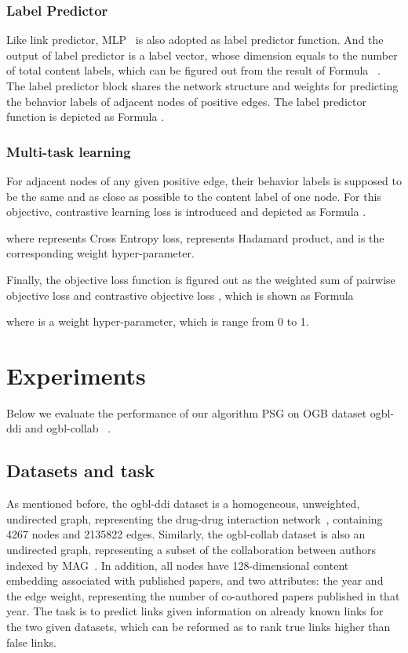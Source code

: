 \documentclass[sigconf]{acmart}
\begin{document}
\subsubsection{Label Predictor}
Like link predictor, MLP~\cite{murtagh1991multilayer} is also adopted as label predictor function. And the output of label predictor is a label vector, whose dimension equals to the number of total content labels, which can be figured out from the result of Formula ~. The label predictor block shares the network structure and weights for predicting the behavior labels of adjacent nodes of positive edges. The label predictor function is depicted as Formula .


\subsubsection{Multi-task learning}
For adjacent nodes of any given positive edge, their behavior labels is supposed to be the same and as close as possible to the content label of one node. For this objective, contrastive learning loss is introduced and depicted as Formula .

\noindent where  represents Cross Entropy loss,  represents Hadamard product, and  is the corresponding weight hyper-parameter.

Finally, the objective loss function is figured out as the weighted sum of pairwise objective loss  and contrastive objective loss , which is shown as Formula 

\noindent where  is a weight hyper-parameter, which is range from 0 to 1.

\section{Experiments}  \label{section_exp}
Below we evaluate the performance of our algorithm PSG on OGB dataset ogbl-ddi and ogbl-collab ~\cite{hu2020ogb}.

\subsection{Datasets and task} As mentioned before, the ogbl-ddi dataset is a homogeneous, unweighted, undirected graph, representing the drug-drug interaction network~\cite{wishart2018drugbank}, containing 4267 nodes and 2135822 edges. Similarly, the ogbl-collab dataset is also an undirected graph, representing a subset of the collaboration between authors indexed by MAG~\cite{wang2020microsoft}. In addition, all nodes have 128-dimensional content embedding associated with published papers, and two attributes: the year and the edge weight, representing the number of co-authored papers published in that year. The task is to predict links given information on already known links for the two given datasets, which can be reformed as to rank true links higher than false links.
\end{document}
